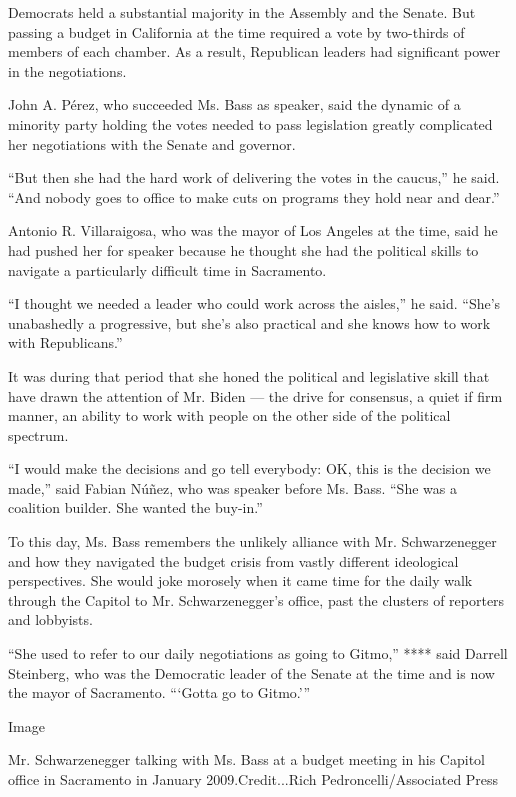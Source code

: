 Democrats held a substantial majority in the Assembly and the Senate.
But passing a budget in California at the time required a vote by
two-thirds of members of each chamber. As a result, Republican leaders
had significant power in the negotiations.

John A. Pérez, who succeeded Ms. Bass as speaker, said the dynamic of a
minority party holding the votes needed to pass legislation greatly
complicated her negotiations with the Senate and governor.

``But then she had the hard work of delivering the votes in the
caucus,'' he said. ``And nobody goes to office to make cuts on programs
they hold near and dear.''

Antonio R. Villaraigosa, who was the mayor of Los Angeles at the time,
said he had pushed her for speaker because he thought she had the
political skills to navigate a particularly difficult time in
Sacramento.

``I thought we needed a leader who could work across the aisles,'' he
said. ``She's unabashedly a progressive, but she's also practical and
she knows how to work with Republicans.''

It was during that period that she honed the political and legislative
skill that have drawn the attention of Mr. Biden --- the drive for
consensus, a quiet if firm manner, an ability to work with people on the
other side of the political spectrum.

``I would make the decisions and go tell everybody: OK, this is the
decision we made,'' said Fabian Núñez, who was speaker before Ms. Bass.
``She was a coalition builder. She wanted the buy-in.''

To this day, Ms. Bass remembers the unlikely alliance with Mr.
Schwarzenegger and how they navigated the budget crisis from vastly
different ideological perspectives. She would joke morosely when it came
time for the daily walk through the Capitol to Mr. Schwarzenegger's
office, past the clusters of reporters and lobbyists.

``She used to refer to our daily negotiations as going to Gitmo,'' ****
said Darrell Steinberg, who was the Democratic leader of the Senate at
the time and is now the mayor of Sacramento. ```Gotta go to Gitmo.'''

Image

Mr. Schwarzenegger talking with Ms. Bass at a budget meeting in his
Capitol office in Sacramento in January 2009.Credit...Rich
Pedroncelli/Associated Press

